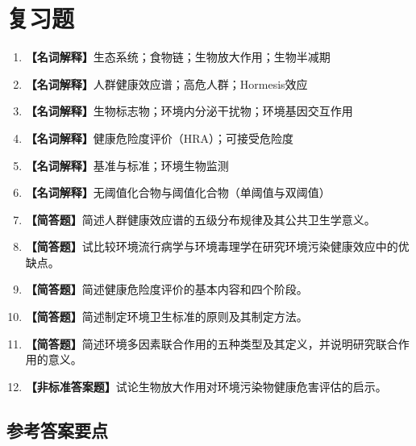 \section{复习题}

\begin{enumerate}[leftmargin=*, itemsep=8pt]
    \item \textbf{【名词解释】}生态系统；食物链；生物放大作用；生物半减期
    \item \textbf{【名词解释】}人群健康效应谱；高危人群；Hormesis效应
    \item \textbf{【名词解释】}生物标志物；环境内分泌干扰物；环境基因交互作用
    \item \textbf{【名词解释】}健康危险度评价（HRA）；可接受危险度
    \item \textbf{【名词解释】}基准与标准；环境生物监测
    \item \textbf{【名词解释】}无阈值化合物与阈值化合物（单阈值与双阈值）
    \item \textbf{【简答题】}简述人群健康效应谱的五级分布规律及其公共卫生学意义。
    \item \textbf{【简答题】}试比较环境流行病学与环境毒理学在研究环境污染健康效应中的优缺点。
    \item \textbf{【简答题】}简述健康危险度评价的基本内容和四个阶段。
    \item \textbf{【简答题】}简述制定环境卫生标准的原则及其制定方法。
    \item \textbf{【简答题】}简述环境多因素联合作用的五种类型及其定义，并说明研究联合作用的意义。
    \item \textbf{【非标准答案题】}试论生物放大作用对环境污染物健康危害评估的启示。
\end{enumerate}

\subsection*{参考答案要点}

